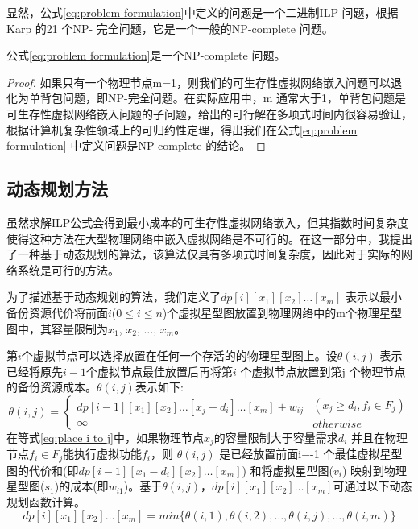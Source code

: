 显然，公式\ref{eq:problem formulation}中定义的问题是一个二进制ILP 问题，根据Karp 的21 个NP- 完全问题\cite{karp1975computational}，它是一个一般的NP-complete 问题。

\begin{theorem}
公式\ref{eq:problem formulation}是一个NP-complete 问题。
\end{theorem}
\begin{proof}
如果只有一个物理节点m=1，则我们的可生存性虚拟网络嵌入问题可以退化为单背包问题，即NP-完全问题。在实际应用中，m 通常大于1，单背包问题是可生存性虚拟网络嵌入问题的子问题，给出的可行解在多项式时间内很容易验证，根据计算机复杂性领域上的可归约性定理\cite{wood1987theory}，得出我们在公式\ref{eq:problem formulation} 中定义问题是NP-complete 的结论。
\end{proof}

\subsection{动态规划方法}
\label{lab:DynamicProgrammingEquation}
虽然求解ILP公式会得到最小成本的可生存性虚拟网络嵌入，但其指数时间复杂度使得这种方法在大型物理网络中嵌入虚拟网络是不可行的。在这一部分中，我提出了一种基于动态规划的算法，该算法仅具有多项式时间复杂度，因此对于实际的网络系统是可行的方法。

为了描述基于动态规划的算法，我们定义了$dp[i][{x_1}][{x_2}] \ldots [{x_m}]$ 表示以最小备份资源代价将前面$i$($0 \le i \le n $)个虚拟星型图放置到物理网络中的m个物理星型图中，其容量限制为$ x_1$, $ x_2$, $\ldots$, $x_m$。

第$i$个虚拟节点可以选择放置在任何一个存活的的物理星型图上。设$\theta (i,j)$ 表示已经将原先$i-1$个虚拟节点最佳放置后再将第$i$ 个虚拟节点放置到第j 个物理节点的备份资源成本。$\theta (i,j)$表示如下:
\begin{equation}
\theta (i,j) = \left\{ {\begin{array}{*{20}{c}}
{dp[i - 1][x_1][{x_2}] \ldots [{x_j} - {d_i}] \ldots [{x_m}] + {w_{ij}}}\\
\infty
\end{array}} \right.\begin{array}{*{20}{c}}
{({x_j} \ge {d_i},{f_i} \in {F_j})}\\
{otherwise}
\end{array}
\label{eq:place i to j}
\end{equation}
在等式\ref{eq:place i to j}中，如果物理节点$x_j$的容量限制大于容量需求$d_i$ 并且在物理节点${f_i} \in {F_j}$能执行虚拟功能$f_i$，则 $\theta (i,j)$ 是已经放置前面i−-1 个最佳虚拟星型图的代价和(即$dp[i-1][{x_1} - {d_i}][{x_2}] \ldots [{x_m}]$) 和将虚拟星型图($v_i$) 映射到物理星型图($s_1$)的成本(即$w_{i1}$)。基于$\theta (i,j)$，$dp[i][{x_1}][{x_2}] \ldots [{x_m}]$可通过以下动态规划函数计算。
\begin{equation}
dp[i][{x_1}][{x_2}] \ldots [{x_m}] = min\{\theta (i,1),\theta (i,2),\ldots,\theta (i,j),\ldots,\theta (i,m)\}
\label{eq:update function}
\end{equation}


